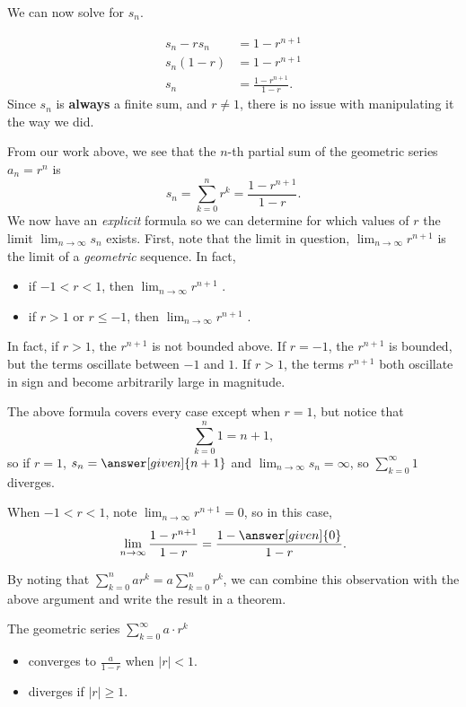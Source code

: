 \documentclass{ximera}
\begin{document}
\begin{example}
\begin{explanation}
 We can now solve for $s_n$.
 
     \begin{align*}
      s_n - r s_n &= 1 - r^{n+1}\\
      s_n(1-r)    &= 1 - r^{n+1}\\
      s_n &= \frac{1 - r^{n+1}}{1-r}.
    \end{align*}
    Since $s_n$ is \textbf{always} a finite sum, and $r \ne 1$, there is no issue
    with manipulating it the way we did.
  \end{explanation}
\end{example}

From our work above, we see that the $n$-th partial sum of the
geometric series $a_n = r^n$ is
\[
s_n = \sum_{k=0}^{n} r^k= \frac{1 - r^{n+1}}{1-r}.
\]
We now have an \emph{explicit} formula so we can determine for which values of $r$ the limit $\lim_{n \to \infty} s_n$ exists.  First, note that the limit in question, $\lim_{n \to \infty} r^{n+1}$ is the limit of a \emph{geometric} sequence.  In fact, 

\begin{itemize}
\item if $-1<r<1$, then $\lim_{n \to \infty} r^{n+1}$ .
\item if $r>1$ or $r\le -1$, then $\lim_{n \to \infty} r^{n+1}$ .
\end{itemize}

In fact, if $r>1$, the $r^{n+1}$ is not bounded above.  If $r=-1$, the $r^{n+1}$ is bounded, but the terms oscillate between $-1$ and $1$.  If $r>1$, the terms $r^{n+1}$ both oscillate in sign and become arbitrarily large in magnitude.

The above formula covers every case except when $r= 1$, but notice that  $$\sum_{k=0}^n 1 = n+1,$$ so if $r=1$, $s_n = \answer[given]{n+1}$ and $\lim_{n \to \infty} s_n = \infty$, so $\sum_{k=0}^{\infty} 1$ diverges. 

When $-1<r<1$, note $\lim_{n \to \infty} r^{n+1}=0$, so in this case,     \[
    \lim_{n\to\infty}\frac{1 - r^{n+1}}{1-r} = \frac{1-\answer[given]{0}}{1-r}.
    \]

By noting that $\sum_{k=0}^n ar^k = a \sum_{k=0}^n r^k$, we can combine this observation with the above argument and write the result in a theorem.

\begin{theorem}
  The geometric series $\sum_{k= 0}^\infty a \cdot r^k$ 
  
  \begin{itemize} 
  \item converges to $\frac{a}{1-r}$ when $|r| < 1$.
  \item diverges if $|r| \geq 1$.  
  \end{itemize}
  \end{theorem}
\end{document}
